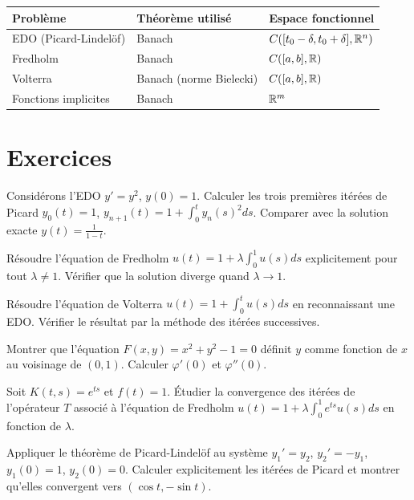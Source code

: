 \begin{formules}[title=\textbf{R\'ecapitulatif des applications}]
\begin{center}
\renewcommand{\arraystretch}{1.3}
\begin{tabular}{|l|l|l|}
\hline
\textbf{Probl\`eme} & \textbf{Th\'eor\`eme utilis\'e} & \textbf{Espace fonctionnel} \\
\hline
EDO (Picard-Lindel\"of) & Banach & $C([t_0-\delta, t_0+\delta], \mathbb{R}^n)$ \\
Fredholm & Banach & $C([a,b], \mathbb{R})$ \\
Volterra & Banach (norme Bielecki) & $C([a,b], \mathbb{R})$ \\
Fonctions implicites & Banach & $\mathbb{R}^m$ \\
\hline
\end{tabular}
\end{center}
\end{formules}

\section{Exercices}

\begin{exercice}
Consid\'erons l'EDO $y' = y^2$, $y(0) = 1$. Calculer les trois premi\`eres it\'er\'ees de
Picard $y_0(t) = 1$, $y_{n+1}(t) = 1 + \int_0^t y_n(s)^2 ds$. Comparer avec la solution
exacte $y(t) = \frac{1}{1-t}$.
\end{exercice}

\begin{exercice}
R\'esoudre l'\'equation de Fredholm $u(t) = 1 + \lambda \int_0^1 u(s) ds$ explicitement
pour tout $\lambda \neq 1$. V\'erifier que la solution diverge quand $\lambda \to 1$.
\end{exercice}

\begin{exercice}
R\'esoudre l'\'equation de Volterra $u(t) = 1 + \int_0^t u(s) ds$ en reconnaissant une
EDO. V\'erifier le r\'esultat par la m\'ethode des it\'er\'ees successives.
\end{exercice}

\begin{exercice}
Montrer que l'\'equation $F(x, y) = x^2 + y^2 - 1 = 0$ d\'efinit $y$ comme fonction de
$x$ au voisinage de $(0, 1)$. Calculer $\varphi'(0)$ et $\varphi''(0)$.
\end{exercice}

\begin{exercice}
Soit $K(t,s) = e^{ts}$ et $f(t) = 1$. \'Etudier la convergence des it\'er\'ees de
l'op\'erateur $T$ associ\'e \`a l'\'equation de Fredholm
$u(t) = 1 + \lambda \int_0^1 e^{ts} u(s) ds$ en fonction de $\lambda$.
\end{exercice}

\begin{exercice}
Appliquer le th\'eor\`eme de Picard-Lindel\"of au syst\`eme $y_1' = y_2$, $y_2' = -y_1$,
$y_1(0) = 1$, $y_2(0) = 0$. Calculer explicitement les it\'er\'ees de Picard et montrer
qu'elles convergent vers $(\cos t, -\sin t)$.
\end{exercice}
